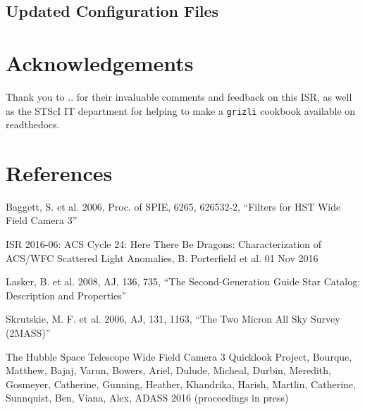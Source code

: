 \documentclass[12pt]{article}
\begin{document}

\subsection{Updated Configuration Files}


\section{Acknowledgements}
\setlength{\parindent}{0pt}

Thank you to .. for their invaluable comments and feedback on this ISR, as well as the
STScI IT department for helping to make a \texttt{grizli} cookbook available on readthedocs.

\newpage
\section{References}
\setlength{\parindent}{0pt}

Baggett, S. et al. 2006, Proc. of SPIE, 6265, 626532-2, ``Filters for HST Wide Field Camera 3''

ISR 2016-06: ACS Cycle 24: Here There Be Dragons: Characterization of ACS/WFC Scattered Light Anomalies, B. Porterfield et al. 01 Nov 2016

Lasker, B. et al. 2008, AJ, 136, 735, ``The Second-Generation Guide Star Catalog: Description and Properties''

Skrutskie, M. F. et al. 2006, AJ, 131, 1163, ``The Two Micron All Sky Survey (2MASS)''

The Hubble Space Telescope Wide Field Camera 3 Quicklook Project, Bourque,
Matthew, Bajaj, Varun, Bowers, Ariel, Dulude, Micheal, Durbin, Meredith, Gosmeyer,
Catherine, Gunning, Heather, Khandrika, Harish, Martlin, Catherine, Sunnquist, Ben,
Viana, Alex, ADASS 2016 (proceedings in press)
\end{document}
